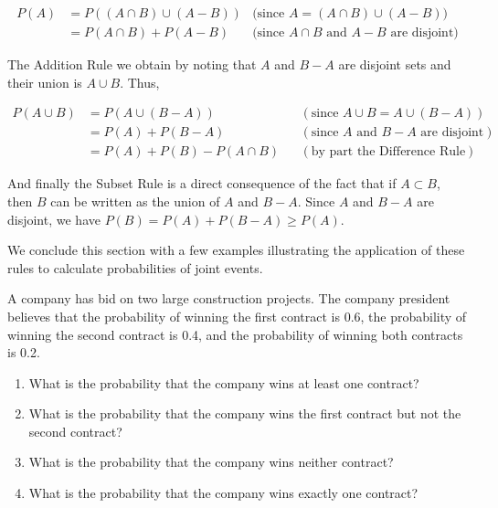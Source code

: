 \begin{align*}
    P(A) &= P\left((A \cap B) \cup (A - B)\right) & \text{(since } A = (A \cap B) \cup (A - B)) \\
         &= P(A \cap B) + P(A - B) & \text{(since } A \cap B \text{ and } A - B \text{ are disjoint)}
    \end{align*}
    

The Addition Rule we obtain by noting that $A$ and $B-A$ are disjoint sets and their union is $A \cup B$. Thus,

\begin{align*}
    P(A \cup B) &= P(A \cup (B - A)) && (\text{since } A \cup B = A \cup (B - A)) \\
                &= P(A) + P(B - A) && (\text{since } A \text{ and } B - A \text{ are disjoint}) \\
                &= P(A) + P(B) - P(A \cap B) && (\text{by part the Difference Rule})
    \end{align*}
    
And finally the Subset Rule is a direct consequence of the fact that if $A \subset B$, then $B$ can be written as the union of $A$ and $B-A$. Since $A$ and $B-A$ are disjoint, we have $P(B)=P(A)+P(B-A) \geq P(A)$.

We conclude this section with a few examples illustrating the application of these rules to calculate probabilities of joint events.

\begin{example}
    A company has bid on two large construction projects. The company president believes that the probability of winning the first contract is 0.6, the probability of winning the second contract is 0.4, and the probability of winning both contracts is 0.2.

    \begin{enumerate}[label=(\alph*)]
        \item What is the probability that the company wins at least one contract?
        \item What is the probability that the company wins the first contract but not the second contract?
        \item What is the probability that the company wins neither contract?
        \item What is the probability that the company wins exactly one contract?
    \end{enumerate}
\end{example}

